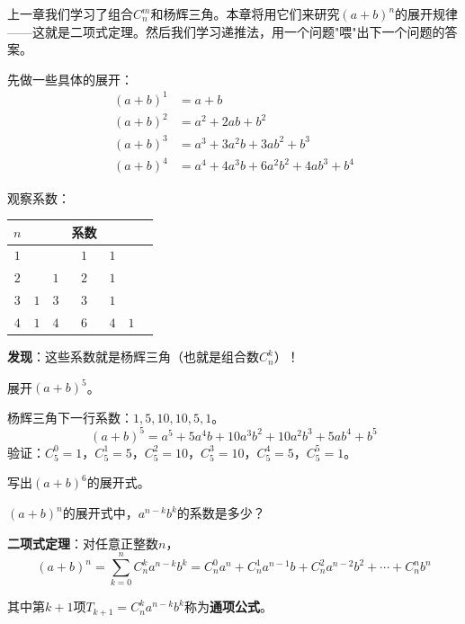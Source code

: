 
上一章我们学习了组合$C_n^m$和杨辉三角。本章将用它们来研究$(a+b)^n$的展开规律——这就是二项式定理。然后我们学习递推法，用一个问题"喂"出下一个问题的答案。


先做一些具体的展开：
\begin{align*}
(a+b)^1 &= a + b \\
(a+b)^2 &= a^2 + 2ab + b^2 \\
(a+b)^3 &= a^3 + 3a^2b + 3ab^2 + b^3 \\
(a+b)^4 &= a^4 + 4a^3b + 6a^2b^2 + 4ab^3 + b^4
\end{align*}

观察系数：
\begin{center}
\begin{tabular}{c|cccccc}
$n$ & & & 系数 & & & \\ \hline
$1$ & & & $1$ & $1$ & & \\
$2$ & & $1$ & $2$ & $1$ & & \\
$3$ & $1$ & $3$ & $3$ & $1$ & & \\
$4$ & $1$ & $4$ & $6$ & $4$ & $1$ & \\
\end{tabular}
\end{center}

\textbf{发现}：这些系数就是杨辉三角（也就是组合数$C_n^k$）！

\begin{example}
展开$(a+b)^5$。
\end{example}
\begin{solution}
杨辉三角下一行系数：$1,5,10,10,5,1$。
\[
(a+b)^5 = a^5 + 5a^4b + 10a^3b^2 + 10a^2b^3 + 5ab^4 + b^5
\]
验证：$C_5^0=1$，$C_5^1=5$，$C_5^2=10$，$C_5^3=10$，$C_5^4=5$，$C_5^5=1$。
\end{solution}

\begin{exercise}
\item 写出$(a+b)^6$的展开式。
\item $(a+b)^n$的展开式中，$a^{n-k}b^k$的系数是多少？
\end{exercise}


\textbf{二项式定理}：对任意正整数$n$，
\[
(a+b)^n = \sum_{k=0}^n C_n^k a^{n-k}b^k = C_n^0 a^n + C_n^1 a^{n-1}b + C_n^2 a^{n-2}b^2 + \cdots + C_n^n b^n
\]

其中第$k+1$项$T_{k+1} = C_n^k a^{n-k}b^k$称为\textbf{通项公式}。

